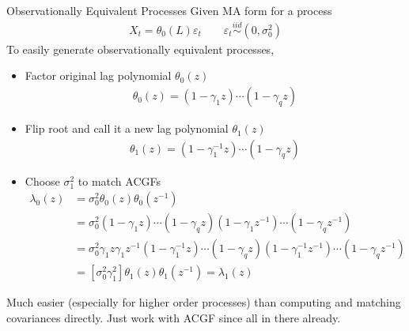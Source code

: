 \documentclass[aspectratio=169, handout]{beamer}
\newcommand{\iid}{\overset{iid}{\sim}}
\begin{document}
{\scriptsize
\begin{frame}{Observationally Equivalent Processes}
Given MA form for a process
\begin{align*}
  X_t = \theta_0(L)\varepsilon_t
  \qquad
  \varepsilon_t
  \iid
  (0,\sigma^2_0)
\end{align*}
To easily generate observationally equivalent processes,
\begin{itemize}
  \item Factor original lag polynomial $\theta_0(z)$
    \begin{align*}
      \theta_0(z) = (1-\gamma_1 z)\cdots(1-\gamma_q z)
    \end{align*}
  \item
    Flip root and call it a new lag polynomial $\theta_1(z)$
    \begin{align*}
      \theta_1(z) = (1-\gamma_1^{-1} z)\cdots(1-\gamma_q z)
    \end{align*}
  \item
    Choose $\sigma_1^2$ to match ACGFs
    \begin{align*}
      \lambda_0(z)
      &= \sigma^2_0\theta_0(z)\theta_0(z^{-1})
      \\
      &=
      \sigma^2_0
      (1-\gamma_1 z)\cdots(1-\gamma_q z)
      (1-\gamma_1 z^{-1})\cdots(1-\gamma_q z^{-1})
      \\
      &=
      \sigma^2_0
      \gamma_1 z \gamma_1z^{-1}
      (1-\gamma_1^{-1} z)\cdots(1-\gamma_q z)
      (1-\gamma_1^{-1} z^{-1})\cdots(1-\gamma_q z^{-1})
      \\
      &=
      [\sigma^2_0 \gamma_1^2]
      \theta_1(z)\theta_1(z^{-1})
      =
      \lambda_1(z)
    \end{align*}
\end{itemize}
Much easier (especially for higher order processes)
than computing and matching covariances directly.
Just work with ACGF since all in there already.
\end{frame}
}




\end{document}

